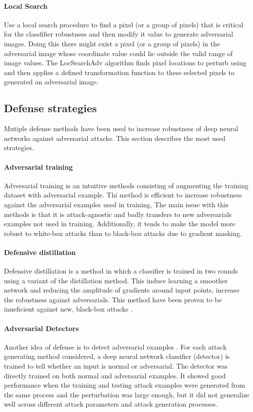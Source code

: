 \documentclass[12pt]{article}
\begin{document}
\paragraph{Local Search} 
Use a local search procedure to find a pixel (or a group of pixels) that is critical for the classfifier robustness and then modify it value to generate adversarial images. Doing this there might exist a pixel (or a group of pixels) in the adversarial image whose coordinate value could lie outside the valid range of image values. The LocSearchAdv algorithm finds pixel locations to perturb using and then applies a defined transformation function to these selected pixels to generated an adversarial image.


\subsection{Defense strategies}
Mutiple defense methods have been used to increase robustness of deep neural networks against adversarial attacks. This section describes the most used strategies.

\paragraph{Adversarial training}
Adversarial training is an intuitive methods consisting of augmenting the training dataset with adversarial example. Thi method is efficient to increase robustness against the adversarial examples used in training. The main issue with this methods is that it is attack-agnostic and badly transfers to new adversarials examples not used in training. Additionally, it tends to make the model more robust to white-box attacks than to black-box attacks due to gradient masking.

\paragraph{Defensive distillation}
Defensive distillation \cite{papernot_distillation_2015} is a method in which a classifier is trained in two rounds using a variant of the distillation \cite{hinton_distilling_2015} method. This induce learning a smoother network and reducing the amplitude of gradients around input points, increase the robustness against adversarials. This method have been proven to be inneficient against new, black-box attacks \cite{carlini_defensive_2016}.

\paragraph{Adversarial Detectors}
Another idea of defense is to detect adversarial examples \cite{metzen_detecting_2017}. For each attack generating method considered, a deep neural network classifier (detector) is trained to tell whether an input is normal or adversarial. The detector was directly trained on both normal and adversarial examples. It showed good performance when the training and testing attack examples were generated from the same process and the perturbation was large enough, but it did not generalize well across different attack parameters and attack generation processes.
\end{document}
